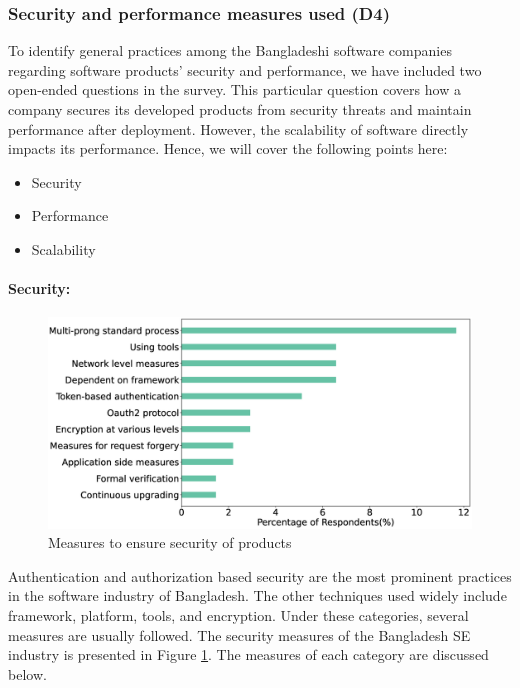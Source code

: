 \subsubsection{Security and performance measures used (D4)}
\label{security_performance}

To identify general practices among the Bangladeshi software companies regarding software products' security and performance, we have included two open-ended questions in the survey. This particular question covers how a company secures its developed products from security threats and maintain performance after deployment. However, the scalability of software directly impacts its performance\cite{Liu2009,Bondi2000}. Hence, we will cover the following points here:
\begin{itemize}
    \item Security
    \item Performance
    \item Scalability
\end{itemize}


\paragraph{Security:}
\label{Security}

\begin{figure}[h]
\centering
\includegraphics[scale=0.22]{Figures/Security.eps} 
\caption{Measures to ensure security of products}
\label{fig:Measures to ensure security}
\end{figure}


Authentication and authorization based security are the most prominent practices in the software industry of Bangladesh. The other techniques used widely include framework, platform, tools, and encryption. Under these categories, several measures are usually followed. The security measures of the Bangladesh SE industry is presented in Figure \ref{fig:Measures to ensure security}. The measures of each category are discussed below.

